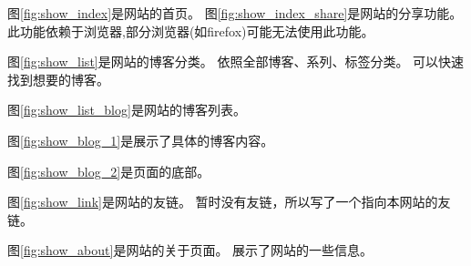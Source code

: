 \documentclass[12pt]{ctexart}
\begin{document}
图\ref{fig:show_index}是网站的首页。
图\ref{fig:show_index_share}是网站的分享功能。
此功能依赖于浏览器,部分浏览器(如firefox)可能无法使用此功能。

图\ref{fig:show_list}是网站的博客分类。
依照全部博客、系列、标签分类。
可以快速找到想要的博客。

图\ref{fig:show_list_blog}是网站的博客列表。

图\ref{fig:show_blog_1}是展示了具体的博客内容。

图\ref{fig:show_blog_2}是页面的底部。

图\ref{fig:show_link}是网站的友链。
暂时没有友链，所以写了一个指向本网站的友链。

图\ref{fig:show_about}是网站的关于页面。
展示了网站的一些信息。
\end{document}
